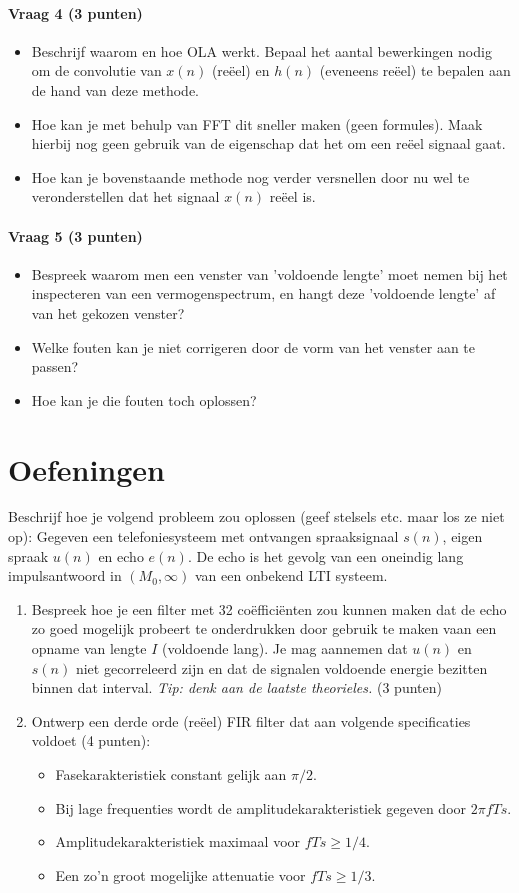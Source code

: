 \documentclass[a4paper]{article}
\begin{document}
\paragraph{Vraag 4 (3 punten)}
\begin{itemize}
	\item Beschrijf waarom en hoe OLA werkt. Bepaal het aantal bewerkingen nodig om de convolutie van $x(n)$ (reëel) en $h(n)$ (eveneens reëel) te bepalen aan de hand van deze methode.
	\item Hoe kan je met behulp van FFT dit sneller maken (geen formules). Maak hierbij nog geen gebruik van de eigenschap dat het om een reëel signaal gaat.
	\item Hoe kan je bovenstaande methode nog verder versnellen door nu wel te veronderstellen dat het signaal $x(n)$ reëel is.
\end{itemize}

\paragraph{Vraag 5 (3 punten)}
\begin{itemize}
	\item Bespreek waarom men een venster van 'voldoende lengte' moet nemen bij het inspecteren van een vermogenspectrum, en hangt deze 'voldoende lengte' af van het gekozen venster?
	\item Welke fouten kan je niet corrigeren door de vorm van het venster aan te passen?
	\item Hoe kan je die fouten toch oplossen?
\end{itemize}

\section{Oefeningen}
Beschrijf hoe je volgend probleem zou oplossen (geef stelsels etc. maar los ze niet op): Gegeven een telefoniesysteem met ontvangen spraaksignaal $s(n)$, eigen spraak $u(n)$ en echo $e(n)$. De echo is het gevolg van een oneindig lang impulsantwoord in $(M_0,\infty)$ van een onbekend LTI systeem.
\begin{enumerate}
	\item Bespreek hoe je een filter met 32 coëfficiënten zou kunnen maken dat de echo zo goed mogelijk probeert te onderdrukken door gebruik te maken vaan een opname van lengte $I$ (voldoende lang). Je mag aannemen dat $u(n)$ en $s(n)$ niet gecorreleerd zijn en dat de signalen voldoende energie bezitten binnen dat interval. \textit{Tip: denk aan de laatste theorieles.} (3 punten)
	\item Ontwerp een derde orde (reëel) FIR filter dat aan volgende specificaties voldoet (4 punten):
	\begin{itemize}
		\item Fasekarakteristiek constant gelijk aan $\pi/2$.
		\item Bij lage frequenties wordt de amplitudekarakteristiek gegeven door $2\pi fTs$.
		\item Amplitudekarakteristiek maximaal voor $fTs \geq 1/4$.
		\item Een zo'n groot mogelijke attenuatie voor $fTs \geq 1/3$.
	\end{itemize}
\end{enumerate}
\end{document}
